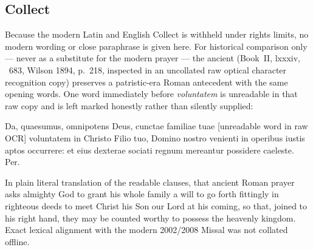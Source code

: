 \subsection{Collect}\label{proper-collect}
Because the modern Latin and English Collect is withheld under rights limits, no modern wording or close paraphrase is given here. For historical comparison only --- never as a substitute for the modern prayer --- the ancient  (Book~II, lxxxiv, ~683, Wilson 1894, p.~218, inspected in an uncollated raw optical character recognition copy) preserves a patristic-era Roman antecedent with the same opening words. One word immediately before \emph{voluntatem} is unreadable in that raw copy and is left marked honestly rather than silently supplied:
\begin{latinproper}
Da, quaesumus, omnipotens Deus, cunctae familiae tuae \textnormal{[unreadable word in raw OCR]} voluntatem in Christo Filio tuo, Domino nostro venienti in operibus iustis aptos occurrere: et eius dexterae sociati regnum mereantur possidere caeleste. Per.
\end{latinproper}
In plain literal translation of the readable clauses, that ancient Roman prayer asks almighty God to grant his whole family a will to go forth fittingly in righteous deeds to meet Christ his Son our Lord at his coming, so that, joined to his right hand, they may be counted worthy to possess the heavenly kingdom. Exact lexical alignment with the modern 2002/2008 Missal was not collated offline.

